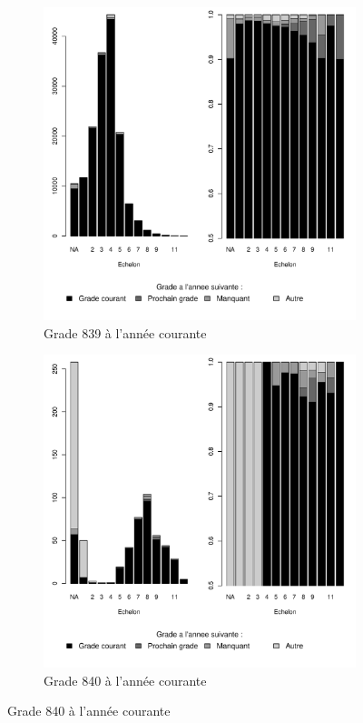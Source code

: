 \documentclass[11pt,a4paper]{article}
\begin{document}
\begin{figure}[ht] 
  \caption{Situation d'une année à l'autre, selon l'échelon}
  \label{evo_by_ech} 
  \begin{subfigure}[b]{0.5\linewidth}
      \caption{Grade 839 à l'année courante}
    \label{evo_by_ech_839} 
    \centering
    \includegraphics[width=1\linewidth]{AS_hazard_by_ech_839.pdf} 
  \end{subfigure}
  \begin{subfigure}[b]{0.5\linewidth}
        \caption{Grade 840 à l'année courante} 
    \label{evo_by_ech_840} 
    \centering
    \includegraphics[width=1\linewidth]{AS_hazard_by_ech_840.pdf} 
  \end{subfigure} 
\end{figure}
\end{document}
